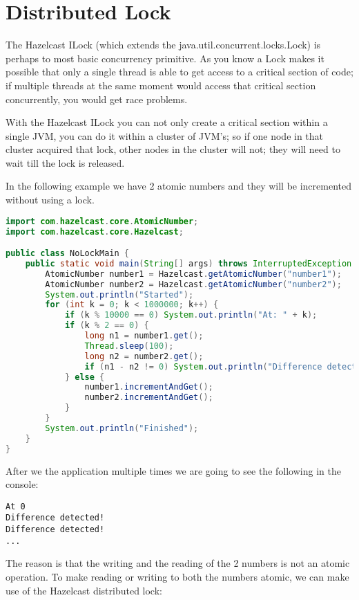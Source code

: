 \section{Distributed Lock}

The Hazelcast ILock (which extends the java.util.concurrent.locks.Lock) is perhaps
to most basic concurrency primitive. As you know a Lock makes it possible that only
a single thread is able to get access to a critical section of code; if multiple threads
at the same moment would access that critical section concurrently, you would get race 
problems. 

With the Hazelcast ILock you can not only create a critical section within a single JVM,
you can do it within a cluster of JVM's; so if one node in that cluster acquired that lock,
other nodes in the cluster will not; they will need to wait till the lock is released.

In the following example we have 2 atomic numbers and they will be incremented without
using a lock.
\begin{lstlisting}[language=java]
import com.hazelcast.core.AtomicNumber;
import com.hazelcast.core.Hazelcast;

public class NoLockMain {
    public static void main(String[] args) throws InterruptedException {
        AtomicNumber number1 = Hazelcast.getAtomicNumber("number1");
        AtomicNumber number2 = Hazelcast.getAtomicNumber("number2");
        System.out.println("Started");
        for (int k = 0; k < 1000000; k++) {
            if (k % 10000 == 0) System.out.println("At: " + k);
            if (k % 2 == 0) {
                long n1 = number1.get();
                Thread.sleep(100);
                long n2 = number2.get();
                if (n1 - n2 != 0) System.out.println("Difference detected!");
            } else {
                number1.incrementAndGet();
                number2.incrementAndGet();
            }
        }
        System.out.println("Finished");
    }
}
\end{lstlisting}

After we the application multiple times we are going to see the following 
in the console:
\begin{verbatim}
At 0
Difference detected!
Difference detected!
...
\end{verbatim}	

The reason is that the writing and the reading of the 2 numbers is not an atomic
operation. To make reading or writing to both the numbers atomic, we can make use 
of the Hazelcast distributed lock:

